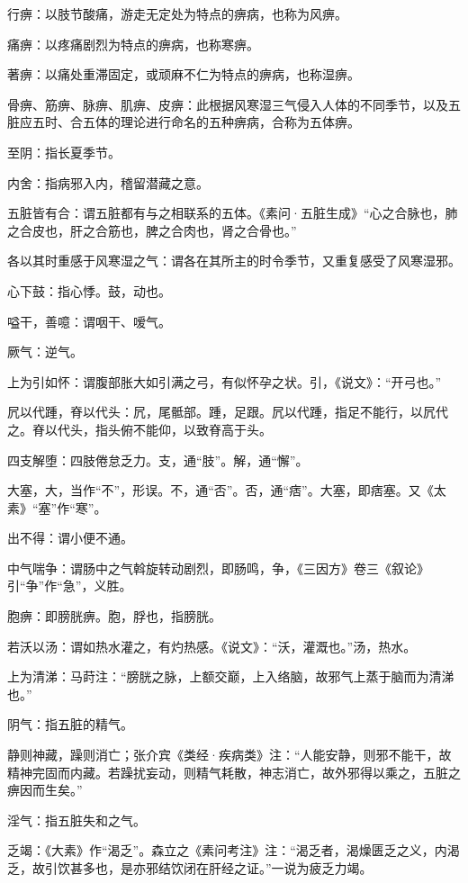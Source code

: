 \documentclass[draft,12pt]{ctexbook}
\begin{document}
\begin{jiaozhu}
  \item 行痹：以肢节酸痛，游走无定处为特点的痹病，也称为风痹。
  \item 痛痹：以疼痛剧烈为特点的痹病，也称寒痹。
  \item 著痹：以痛处重滞固定，或顽麻不仁为特点的痹病，也称湿痹。
  \item 骨痹、筋痹、脉痹、肌痹、皮痹：此根据风寒湿三气侵入人体的不同季节，以及五脏应五时、合五体的理论进行命名的五种痹病，合称为五体痹。
  \item 至阴：指长夏季节。
  \item 内舍：指病邪入内，稽留潜藏之意。
  \item 五脏皆有合：谓五脏都有与之相联系的五体。《素问·五脏生成》“心之合脉也，肺之合皮也，肝之合筋也，脾之合肉也，肾之合骨也。”
  \item 各以其时重感于风寒湿之气：谓各在其所主的时令季节，又重复感受了风寒湿邪。
  \item 心下鼓：指心悸。鼓，动也。
  \item 嗌干，善噫：谓咽干、嗳气。
  \item 厥气：逆气。
  \item 上为引如怀：谓腹部胀大如引满之弓，有似怀孕之状。引，《说文》：“开弓也。”
  \item 凥以代踵，脊以代头：凥，尾骶部。踵，足跟。凥以代踵，指足不能行，以凥代之。脊以代头，指头俯不能仰，以致脊高于头。
  \item 四支解堕：四肢倦怠乏力。支，通“肢”。解，通“懈”。
  \item 大塞，大，当作“不”，形误。不，通“否”。否，通“痞”。大塞，即痞塞。又《太素》“塞”作“寒”。
  \item 出不得：谓小便不通。
  \item 中气喘争：谓肠中之气斡旋转动剧烈，即肠鸣，争，《三因方》卷三《叙论》引“争”作“急”，义胜。
  \item 胞痹：即膀胱痹。胞，脬也，指膀胱。
  \item 若沃以汤：谓如热水灌之，有灼热感。《说文》：“沃，灌溉也。”汤，热水。
  \item 上为清涕：马莳注：“膀胱之脉，上额交巅，上入络脑，故邪气上蒸于脑而为清涕也。”
  \item 阴气：指五脏的精气。
  \item 静则神藏，躁则消亡；张介宾《类经·疾病类》注：“人能安静，则邪不能干，故精神完固而内藏。若躁扰妄动，则精气耗散，神志消亡，故外邪得以乘之，五脏之痹因而生矣。”
  \item 淫气：指五脏失和之气。
  \item 乏竭：《大素》作“渴乏”。森立之《素问考注》注：“渴乏者，渴燥匮乏之义，内渴乏，故引饮甚多也，是亦邪结饮闭在肝经之证。”一说为疲乏力竭。

\end{jiaozhu}
\end{document}
